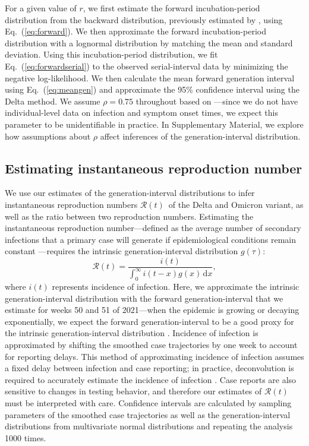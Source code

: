 \documentclass[12pt]{article}
\newcommand{\comment}{\showcomment}
\newcommand{\showcomment}[3]{\textcolor{#1}{\textbf{[#2: }\textsl{#3}\textbf{]}}}
\newcommand{\jd}[1]{\comment{cyan}{JD}{#1}}
\newcommand{\swp}[1]{\comment{magenta}{SWP}{#1}}
\newcommand{\eref}[1]{Eq.~(\ref{eq:#1})}
\newcommand{\Rt}{\ensuremath{{\mathcal R}(t)}\xspace}
\newcommand{\dd}[1]{\ensuremath{\, \mathrm{d}#1}}
\newcommand{\dx}{\dd{x}}
\begin{document}
For a given value of $r$, we first estimate the forward incubation-period distribution from the backward distribution, previously estimated by \cite{backer2021omicron}, using \eref{forward}.
We then approximate the forward incubation-period distribution with a lognormal distribution by matching the mean and standard deviation.
Using this incubation-period distribution, we fit \eref{forwardserial} to the observed serial-interval data by minimizing the negative log-likelihood.
We then calculate the mean forward generation interval using \eref{meangen} and approximate the 95\% confidence interval using the Delta method.
We assume $\rho = 0.75$ throughout based on \cite{sender2021unmitigated}---since we do not have individual-level data on infection and symptom onset times, we expect this parameter to be unidentifiable in practice.
In Supplementary Material, we explore how assumptions about $\rho$ affect inferences of the generation-interval distribution.

\subsection{Estimating instantaneous reproduction number}

We use our estimates of the generation-interval distributions to infer instantaneous reproduction numbers \Rt\ of the Delta and Omicron variant, as well as the ratio between two reproduction numbers.
Estimating the instantaneous reproduction number---defined as the average number of secondary infections that a primary case will generate if epidemiological conditions remain constant \citep{fraser2007estimating}---requires the intrinsic generation-interval distribution $g(\tau)$:
\begin{equation}
\Rt = \frac{i(t)}{\int_0^\infty i(t-x) g(x) \dx},
\end{equation}
where $i(t)$ represents incidence of infection.
Here, we approximate the intrinsic generation-interval distribution with the forward generation-interval that we estimate for weeks 50 and 51 of 2021---when the epidemic is growing or decaying exponentially, we expect the forward generation-interval to be a good proxy for the intrinsic generation-interval distribution \citep{champredon2015intrinsic, park2020inferring}.
Incidence of infection is approximated by shifting the smoothed case trajectories by one week to account for reporting delays.
This method of approximating incidence of infection assumes a fixed delay between infection and case reporting;
in practice, deconvolution is required to accurately estimate the incidence of infection \citep{goldstein2009reconstructing}.
Case reports are also sensitive to changes in testing behavior, and therefore our estimates of $\Rt$ must be interpreted with care.
Confidence intervals are calculated by sampling parameters of the smoothed case trajectories as well as the generation-interval distributions from multivariate normal distributions and repeating the analysis 1000 times.
\end{document}
